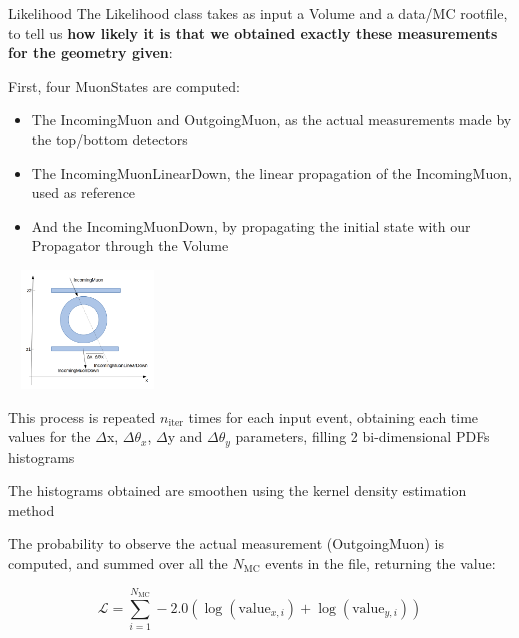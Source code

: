 \documentclass[8 pt]{beamer}
\begin{document}
\begin{frame}{Likelihood}
\justifying
The Likelihood class takes as input a Volume and a data/MC rootfile, to tell us \textbf{how likely it is that we obtained exactly these measurements for the geometry given}: \vspace{5pt}

\begin{enumerate}
\begin{minipage}[c]{.58\textwidth}
\item First, four MuonStates are computed:
	\begin{itemize}
	\justifying
	\item The IncomingMuon and OutgoingMuon, as the actual measurements made by the top/bottom detectors
	\item The IncomingMuonLinearDown, the linear propagation of the IncomingMuon, used as reference
	\item And the IncomingMuonDown, by propagating the initial state with our Propagator through the Volume
	\end{itemize}
\end{minipage}
\begin{minipage}[c]{.36\textwidth}
\includegraphics[width=4.2cm, height=3.15cm]{figs/parameters.png}
\end{minipage} \vspace{5pt}

\justifying
\item This process is repeated $n_{\text{iter}}$ times for each input event, obtaining each time values for the $\Delta$x, $\Delta \theta_x$, $\Delta$y and $\Delta \theta_y$ parameters, filling 2 bi-dimensional PDFs histograms \vspace{5pt}
\item The histograms obtained are smoothen using the kernel density estimation method \vspace{5pt}
\item The probability to observe the actual measurement (OutgoingMuon) is computed, and summed over all the ${N_\text{MC}}$ events in the file, returning the value:

\begin{equation*}
\label{eq:totallikelihood}
\mathcal{L} = \sum_{i = 1}^{N_\text{MC}} -2.0 \left ( \log(\text{value}_{x, i}) + \log(\text{value}_{y, i}) \right)
\end{equation*}
\end{enumerate} \vfill
\end{frame}
\end{document}
